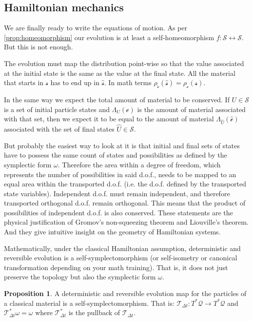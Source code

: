 \documentclass[aps,pra,10pt,twocolumn,floatfix,nofootinbib]{revtex4-1}
\numberwithin{equation}{section}
\theoremstyle{definition}
\newtheorem{prop}[equation]{Proposition}
\begin{document}
\subsection{Hamiltonian mechanics}

We are finally ready to write the equations of motion. As per \ref{prop:homeomorphism} our evolution is at least a self-homeomorphism $f:\mathcal{S} \leftrightarrow \mathcal{S}$. But this is not enough.

The evolution must map the distribution point-wise so that the value associated at the initial state is the same as the value at the final state. All the material that starts in $\mathcal{s}$ has to end up in $\hat{\mathcal{s}}$. In math terms $\rho_{\hat{\mathcal{c}}} (\hat{\mathcal{s}}) = \rho_\mathcal{c}(\mathcal{s})$.

In the same way we expect the total amount of material to be conserved. If $U \in \mathcal{S}$ is a set of initial particle states and $\Lambda_U(\mathcal{c})$ is the amount of material associated with that set, then we expect it to be equal to the amount of material $\Lambda_{\hat{U}}(\hat{\mathcal{c}})$ associated with the set of final states $\hat{U} \in \mathcal{S}$.

But probably the easiest way to look at it is that initial and final sets of states have to possess the same count of states and possibilities as defined by the symplectic form $\omega$. Therefore the area within a degree of freedom, which represents the number of possibilities in said d.o.f., needs to be mapped to an equal area within the transported d.o.f. (i.e. the d.o.f. defined by the transported state variables). Independent d.o.f. must remain independent, and therefore transported orthogonal d.o.f. remain orthogonal. This means that the product of possibilities of independent d.o.f. is also conserved. These statements are the physical justification of Gromov's non-squeezing theorem \cite{Gromov,deGosson,Stewart} and Liouville's theorem. And they give intuitive insight on the geometry of Hamiltonian systems.

Mathematically, under the classical Hamiltonian assumption,  deterministic and reversible evolution is a self-symplectomorphism (or self-isometry or canonical transformation depending on your math training). That is, it does not just preserve the topology but also the symplectic form $\omega$.

\begin{prop}\label{prop:symplectomorphism}
	A deterministic and reversible evolution map for the particles of a classical material is a self-symplectomorphism. That is: $\mathcal{T}_{\Delta t}: T^*\mathcal{Q} \rightarrow T^*\mathcal{Q}$ and $\mathcal{T}_{\Delta t}^*\omega = \omega$ where $\mathcal{T}_{\Delta t}^*$ is the pullback of $\mathcal{T}_{\Delta t}$.
\end{prop}
\end{document}
